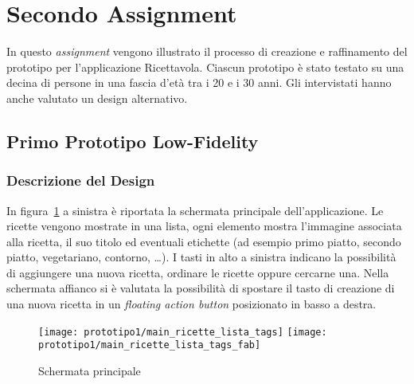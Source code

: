 







\section{Secondo Assignment}
In questo \textit{assignment} vengono illustrato il processo di creazione e raffinamento del prototipo per l'applicazione Ricettavola.
Ciascun prototipo è stato testato su una decina di persone in una fascia d'età tra i 20 e i 30 anni.
Gli intervistati hanno anche valutato un design alternativo.


\subsection{Primo Prototipo Low-Fidelity}

\subsubsection{Descrizione del Design}

In figura~\ref{fig:p1_main} a sinistra è riportata la schermata principale dell'applicazione.
Le ricette vengono mostrate in una lista, ogni elemento mostra l'immagine associata alla ricetta, il suo titolo ed eventuali etichette (ad esempio primo piatto, secondo piatto, vegetariano, contorno, \dots ).
I tasti in alto a sinistra indicano la possibilità di aggiungere una nuova ricetta, ordinare le ricette oppure cercarne una.
Nella schermata affianco si è valutata la possibilità di spostare il tasto di creazione di una nuova ricetta in un \textit{floating action button} posizionato in basso a destra.

\begin{figure}[ht]
  \begin{center}
    \texttt{[image: prototipo1/main\_ricette\_lista\_tags]}
    \texttt{[image: prototipo1/main\_ricette\_lista\_tags\_fab]}
    \caption{Schermata principale}
    \label{fig:p1_main}
  \end{center}
\end{figure}

